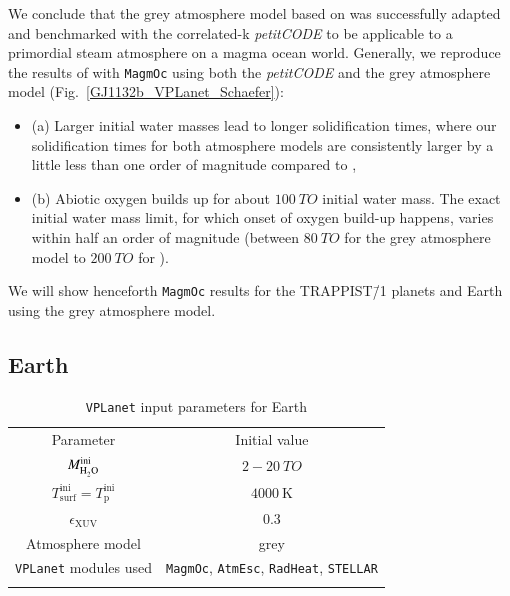 \documentclass[paper=letterpaper,fontsize=12pt,oneside,twocolumn]{article}
\newcommand{\vplanet}{\texttt{\footnotesize{VPLanet}}}
\newcommand{\atmesc}{\texttt{\footnotesize{AtmEsc}}}
\newcommand{\radheat}{\texttt{\footnotesize{RadHeat}}}
\newcommand{\stellar}{\texttt{\footnotesize{STELLAR}}}
\newcommand{\magmoc}{\texttt{\footnotesize{MagmOc}}}
\newcommand{\petit}{\textit{petitCODE}}
\begin{document}
We conclude that the grey atmosphere model based on \citet{Elkins-Tanton2008, Carone2014} was successfully adapted and benchmarked with the correlated-k \petit{} \citep{Molliere2015, Molliere2017} to be applicable to a primordial steam atmosphere on a magma ocean world. 
Generally, we reproduce the results of \citet{Schaefer2016} with \magmoc{} using both the \petit{} and the grey atmosphere model (Fig.~\ref{GJ1132b_VPLanet_Schaefer}): 
\begin{itemize}
    \item (a) Larger initial water masses lead to longer solidification times, where our solidification times for both atmosphere models are consistently larger by a little less than one order of magnitude compared to \citet{Schaefer2016},  
    \item (b) Abiotic oxygen builds up for about $\SI{100}{TO}$ initial water mass. The exact initial water mass limit, for which onset of oxygen build-up happens, varies within half an order of magnitude (between $\SI{80}{TO}$ for the grey atmosphere model to $\SI{200}{TO}$ for \citet{Schaefer2016}).
\end{itemize}
We will show henceforth \magmoc{} results for the TRAPPIST\=/1 planets and Earth using the grey atmosphere model.

\subsection{Earth}
\label{sec: Earth}

\begin{table}[h]
    \caption{\vplanet{} input parameters for Earth}
	\begin{tabular}{cc}
		\noalign{\smallskip}
		\hline
		\noalign{\smallskip}
		Parameter & Initial value\\ 
		\noalign{\smallskip}
		\hline \hline
		\noalign{\smallskip}
		$M_{\ce{H2O}}^\mathrm{ini} $ & $2-\SI{20}{TO}$ \\
		$T_\mathrm{surf}^\mathrm{ini} = T_\mathrm{p}^\mathrm{ini} $ & $\SI{4000}{\kelvin}$ \\
		$\epsilon_\mathrm{XUV}$ & 0.3  \\ 
		Atmosphere model & grey \\
		\vplanet{} modules used & \magmoc{}, \atmesc{}, \radheat{}, \stellar{} \\
		\noalign{\smallskip}
		\hline
	\end{tabular}
	\label{Tab_Input_Earth}
\end{table}
\end{document}
